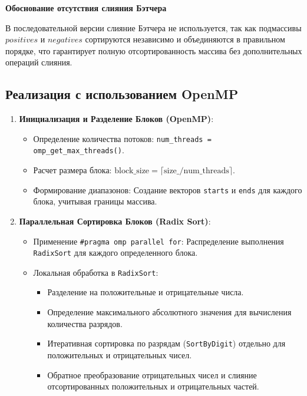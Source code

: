 \documentclass[12pt,a4paper]{extarticle}
\begin{document}
\textbf{Обоснование отсутствия слияния Бэтчера}

В последовательной версии слияние Бэтчера не используется, так как подмассивы $positives$ и $negatives$ сортируются независимо и объединяются в правильном порядке, что гарантирует полную отсортированность массива без дополнительных операций слияния.

	
	\subsection{Реализация с использованием OpenMP}
\begin{enumerate}
    
    \item \textbf{Инициализация и Разделение Блоков (OpenMP)}:
    \begin{itemize}
        \item Определение количества потоков: \texttt{num\_threads = omp\_get\_max\_threads()}.
        \item Расчет размера блока: $\mathrm{block\_size} = \lceil \mathrm{size\_} / \mathrm{num\_threads} \rceil$.
        \item Формирование диапазонов: Создание векторов \texttt{starts} и \texttt{ends} для каждого блока, учитывая границы массива.
    \end{itemize}
    
    \item \textbf{Параллельная Сортировка Блоков (Radix Sort)}:
    \begin{itemize}
        \item Применение \texttt{\#pragma omp parallel for}: Распределение выполнения \texttt{RadixSort} для каждого определенного блока.
        \item Локальная обработка в \texttt{RadixSort}:
        \begin{itemize}
            \item Разделение на положительные и отрицательные числа.
            \item Определение максимального абсолютного значения для вычисления количества разрядов.
            \item Итеративная сортировка по разрядам (\texttt{SortByDigit}) отдельно для положительных и отрицательных чисел.
            \item Обратное преобразование отрицательных чисел и слияние отсортированных положительных и отрицательных частей.
        \end{itemize}
    \end{itemize}
    

\end{enumerate}
\end{document}
